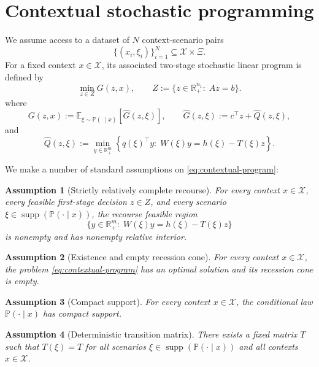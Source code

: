 \documentclass{article}
\newcommand{\R}{\mathbb{R}}
\newcommand{\E}{\mathbb{E}}
\theoremstyle{plain}
\newtheorem{assumption}{Assumption}
\begin{document}
\section{Contextual stochastic programming}
\label{sec:contextual-stochastic}

We assume access to a dataset of $N$ context-scenario pairs
\[
\{(x_i,\xi_i)\}_{i=1}^N \subseteq \mathcal X \times \Xi.
\]
For a fixed context $x\in\mathcal X$, its associated two-stage stochastic linear program is defined by
\begin{equation}
\label{eq:contextual-program}
\min_{z\in Z} G(z,x),
\qquad
Z:=\{z\in\R^{n_1}_+:\;Az=b\}.
\end{equation}
where
\begin{equation}
\label{eq:contextual-G}
G(z,x):=\E_{\xi\sim\mathbb P(\cdot\mid x)}\!\left[\hat G(z,\xi)\right],
\qquad
\hat G(z,\xi):=c^\top z+\hat Q(z,\xi),
\end{equation}
and
\begin{equation}
\label{eq:contextual-hatQ}
\hat Q(z,\xi):=\min_{y\in\R^{m}_+}\left\{q(\xi)^\top y:\;W(\xi)y=h(\xi)-T(\xi)z\right\}.
\end{equation}

We make a number of standard assumptions on \eqref{eq:contextual-program}:
\begin{assumption}[Strictly relatively complete recourse]
\label{ass:strict-recourse}
For every context $x\in\mathcal X$, every feasible first-stage decision $z\in Z$, and every scenario
$\xi\in\operatorname{supp}(\mathbb P(\cdot\mid x))$, the recourse feasible region
\[
\{y\in\R^{m}_+:\;W(\xi)y=h(\xi)-T(\xi)z\}
\]
is nonempty and has nonempty relative interior.
\end{assumption}

\begin{assumption}[Existence and empty recession cone]
\label{ass:context-existence}
For every context $x\in\mathcal X$, the problem \eqref{eq:contextual-program} has an optimal solution and its
recession cone is empty.
\end{assumption}

\begin{assumption}[Compact support]
\label{ass:compact-support}
For every context $x\in\mathcal X$, the conditional law $\mathbb P(\cdot\mid x)$ has compact support.
\end{assumption}

\begin{assumption}[Deterministic transition matrix]
\label{ass:contextual-T-deterministic}
There exists a fixed matrix $T$ such that $T(\xi)=T$ for all scenarios $\xi\in\operatorname{supp}(\mathbb P(\cdot\mid x))$ and all contexts $x\in\mathcal X$.
\end{assumption}
\end{document}
